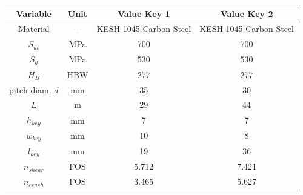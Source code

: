 \begin{tabular}{|c|c|c|c|}
\hline
Variable & Unit & Value Key 1 & Value Key 2 \\ \hline

Material & --- & KESH 1045 Carbon Steel & KESH 1045 Carbon Steel \\ \hline
$S_{ut}$ & MPa & 700 & 700 \\ \hline
$S_{y}$ & MPa & 530 & 530 \\ \hline
$H_B$ & HBW & 277 & 277 \\ \hline
pitch diam. $d$ & mm & 35 & 30 \\ \hline
$L$ & m & 29 & 44 \\ \hline
$h_{key}$ & mm & 7 & 7 \\ \hline
$w_{key}$ & mm & 10 & 8 \\ \hline
$l_{key}$ & mm & 19 & 36 \\ \hline
$n_{shear}$ & FOS & 5.712 & 7.421 \\ \hline
$n_{crush}$ & FOS & 3.465 & 5.627 \\ \hline

\end{tabular}

